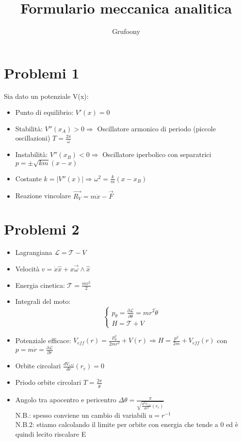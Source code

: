 \documentclass[a4paper]{article}
\begin{document}
	\title{Formulario meccanica analitica}
	\author{Grufoony}
    \maketitle
    \section{Problemi 1}
        Sia dato un potenziale V(x):
        \begin{itemize}
            \item Punto di equilibrio: $V'(x)=0$
            \item Stabilità: $V''(x_A)>0 \Rightarrow$ Oscillatore armonico di periodo (piccole oscillazioni) $T=\frac{2\pi}{\omega}$
            \item Instabilità: $V''(x_B)<0 \Rightarrow$ Oscillatore iperbolico con separatrici $p=\pm\sqrt{km}(x-x)$
            \item Costante $k=\lvert V''(x) \rvert \Rightarrow \omega^2=\frac{k}{m}(x-x_B)$
            \item Reazione vincolare $\vec{R_V}=m\ddot{x}-\vec{F}$
        \end{itemize}
    \section{Problemi 2}
        \begin{itemize}
            \item Lagrangiana $\mathcal{L}=\mathcal{T}-V$
            \item Velocità $v=\dot{x}\hat{x}+x\vec{\omega}\wedge\hat{x}$
            \item Energia cinetica: $\mathcal{T}=\frac{mv^2}{2}$
            \item Integrali del moto:
                \begin{equation}
                    \begin{cases}
                    p_\theta=\frac{\partial{\mathcal{L}}}{\partial{\dot{\theta}}}=mr^2\dot{\theta}\\
                    H=\mathcal{T}+V
                    \end{cases}
                \end{equation}
            \item Potenziale efficace: $V_{eff}(r)=\frac{p_\theta^2}{2mr^2}+V(r) \Rightarrow H=\frac{p^2}{2m}+V_{eff}(r)$ con $p=m\dot{r}=\frac{\partial{\mathcal{L}}}{\partial{\dot{r}}}$
            \item Orbite circolari $\frac{dV_{eff}}{dr}(r_c)=0$
            \item Priodo orbite circolari $T=\frac{2\pi}{\dot{\theta}}$
            \item Angolo tra apocentro e pericentro $\Delta\theta=\frac{\pi}{\sqrt{\frac{d^2V_{eff}}{dr^2}(r_c)}}$ \\
                    N.B.: spesso conviene un cambio di variabili $u=r^{-1}$ \\
                    N.B.2: stiamo calcolando il limite per orbite con energia che tende a 0 ed è quindi lecito riscalare E
        \end{itemize}
\end{document}

